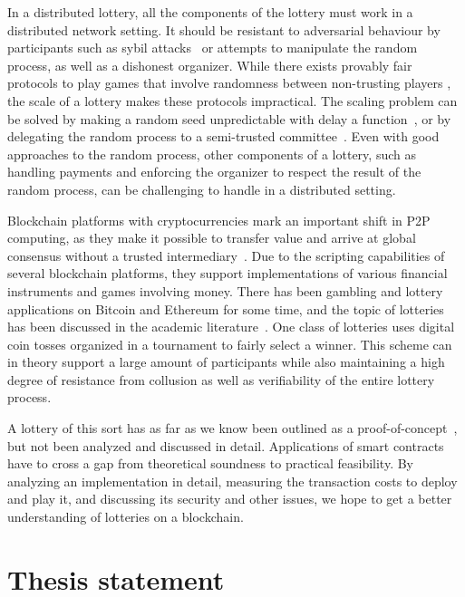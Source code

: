 In a distributed lottery, all the components of the lottery must work in a distributed network setting. It should be resistant to adversarial behaviour by participants such as sybil attacks~\cite{douceur2002sybil} or attempts to manipulate the random process, as well as a dishonest organizer. While there exists provably fair protocols to play games that involve randomness between non-trusting players \cite{shamir_mental_1981, blum1983coin, broder_provably_1985, goldreich_how_1987}, the scale of a lottery makes these protocols impractical. The scaling problem can be solved by making a random seed unpredictable with delay a function~\cite{goldschlag_publicly_1998}, or by delegating the random process to a semi-trusted committee~\cite{fouque_sharing_2001}. Even with good approaches to the random process, other components of a lottery, such as handling payments and enforcing the organizer to respect the result of the random process, can be challenging to handle in a distributed setting. 

Blockchain platforms with cryptocurrencies mark an important shift in P2P computing, as they make it possible to transfer value and arrive at global consensus without a trusted intermediary~\cite{crosby_blockchain_2016}. Due to the scripting capabilities of several blockchain platforms, they support implementations of various financial instruments and games involving money. There has been gambling and lottery applications on Bitcoin and Ethereum for some time, and the topic of lotteries has been discussed in the academic literature~\cite{back_note_2014,andrychowicz_fair_2014,andrychowicz_secure_2014,bentov_how_2014,miller_zero-collateral_2017,bartoletti_constant-deposit_2017}. One class of lotteries uses digital coin tosses organized in a tournament to fairly select a winner. This scheme can in theory support a large amount of participants while also maintaining a high degree of resistance from collusion as well as verifiability of the entire lottery process.

A lottery of this sort has as far as we know been outlined as a proof-of-concept~\cite{miller_zero-collateral_2017}, but not been analyzed and discussed in detail. Applications of smart contracts have to cross a gap from theoretical soundness to practical feasibility. By analyzing an implementation in detail, measuring the transaction costs to deploy and play it, and discussing its security and other issues, we hope to get a better understanding of lotteries on a blockchain.

\section{Thesis statement}
\label{sec:statement}

